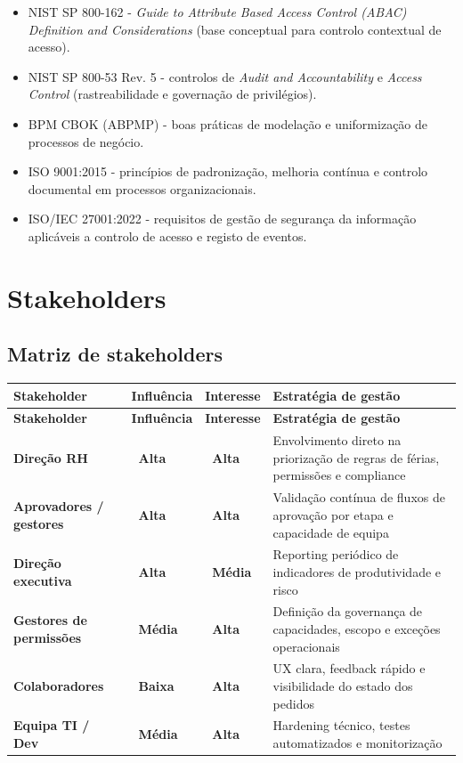 \documentclass[11pt,a4paper,twoside]{article}
\newcommand{\taghi}  {{\setlength{\fboxsep}{1.5pt}\colorbox{TAGHI}  {\scriptsize\sffamily\bfseries\color{white}~Alta~}}}
\newcommand{\tagmed} {{\setlength{\fboxsep}{1.5pt}\colorbox{TAGMED} {\scriptsize\sffamily\bfseries\color{white}~Média~}}}
\newcommand{\taglo}  {{\setlength{\fboxsep}{1.5pt}\colorbox{TAGLO}  {\scriptsize\sffamily\bfseries\color{white}~Baixa~}}}
\newcommand{\tH}[1]{\textbf{\sffamily\small\color{white}#1}}
\newcommand{\theadrow}{\rowcolor{ACCENT}}
\begin{document}
\begin{itemize}
  \item NIST SP 800-162 - \textit{Guide to Attribute Based Access Control (ABAC) Definition and Considerations} (base conceptual para controlo contextual de acesso).
  \item NIST SP 800-53 Rev. 5 - controlos de \textit{Audit and Accountability} e \textit{Access Control} (rastreabilidade e governação de privilégios).
  \item BPM CBOK (ABPMP) - boas práticas de modelação e uniformização de processos de negócio.
  \item ISO 9001:2015 - princípios de padronização, melhoria contínua e controlo documental em processos organizacionais.
  \item ISO/IEC 27001:2022 - requisitos de gestão de segurança da informação aplicáveis a controlo de acesso e registo de eventos.
\end{itemize}

\section{Stakeholders}

\subsection{Matriz de stakeholders}

\begin{longtable}{>{\small\bfseries}p{4.0cm} >{\small\centering\arraybackslash}p{2.2cm} >{\small\centering\arraybackslash}p{2.2cm} >{\small}p{5.4cm}}
\theadrow
\tH{Stakeholder} & \tH{Influência} & \tH{Interesse} & \tH{Estratégia de gestão} \\
\midrule
\endfirsthead
\theadrow
\tH{Stakeholder} & \tH{Influência} & \tH{Interesse} & \tH{Estratégia de gestão} \\
\midrule
\endhead
Direção RH & \taghi & \taghi & Envolvimento direto na priorização de regras de férias, permissões e compliance \\
Aprovadores / gestores & \taghi & \taghi & Validação contínua de fluxos de aprovação por etapa e capacidade de equipa \\
Direção executiva & \taghi & \tagmed & Reporting periódico de indicadores de produtividade e risco \\
Gestores de permissões & \tagmed & \taghi & Definição da governança de capacidades, escopo e exceções operacionais \\
Colaboradores & \taglo & \taghi & UX clara, feedback rápido e visibilidade do estado dos pedidos \\
Equipa TI / Dev & \tagmed & \taghi & Hardening técnico, testes automatizados e monitorização \\
\bottomrule
\end{longtable}
\end{document}
